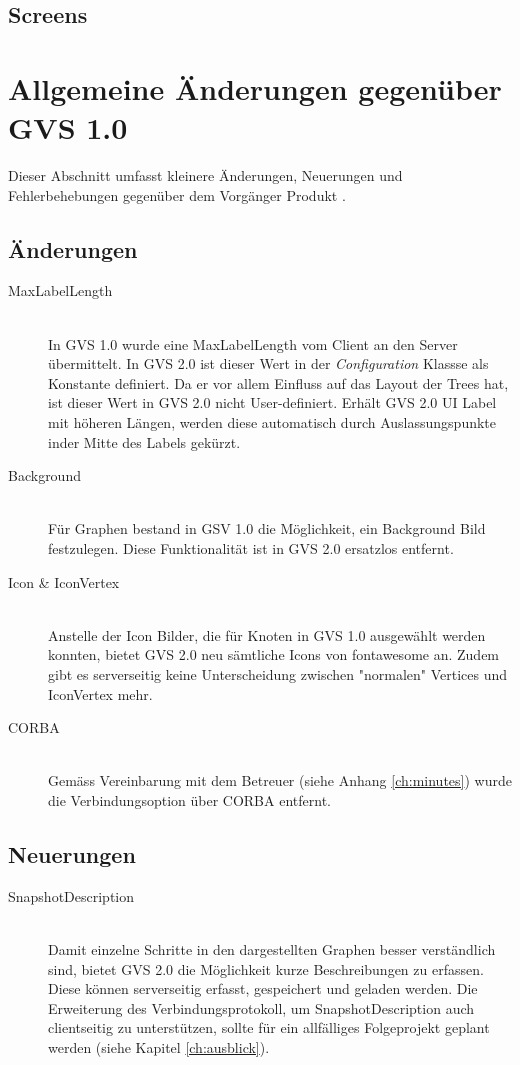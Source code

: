 \documentclass[11pt,a4paper,english,oneside]{book}
\numberwithin{equation}{chapter}
\begin{document}
	\subsection{Screens}
	
	\section{Allgemeine Änderungen gegenüber GVS 1.0}
	Dieser Abschnitt umfasst kleinere Änderungen, Neuerungen und Fehlerbehebungen gegenüber dem Vorgänger Produkt \cite{gvs1}. 
	
	\subsection{Änderungen}
	\begin{description}
		\item[MaxLabelLength] \hfill \\ In GVS 1.0 wurde eine MaxLabelLength vom Client an den Server übermittelt. In GVS 2.0 ist dieser Wert in der \textit{Configuration} Klassse als Konstante definiert. Da er vor allem Einfluss auf das Layout der Trees hat, ist dieser Wert in GVS 2.0 nicht User-definiert. Erhält GVS 2.0 UI Label mit höheren Längen, werden diese automatisch durch Auslassungspunkte inder Mitte des Labels gekürzt.
		\item[Background] \hfill \\ Für Graphen bestand in GSV 1.0 die Möglichkeit, ein Background Bild festzulegen. Diese Funktionalität ist in GVS 2.0 ersatzlos entfernt.
		\item[Icon \& IconVertex] \hfill \\ Anstelle der Icon Bilder, die für Knoten in GVS 1.0 ausgewählt werden konnten, bietet GVS 2.0 neu sämtliche Icons von \gls{fontawesome} \cite{fontawesome} an. Zudem gibt es serverseitig keine Unterscheidung zwischen "normalen" Vertices und IconVertex mehr.
		\item[CORBA] \hfill \\Gemäss Vereinbarung mit dem Betreuer (siehe Anhang \ref{ch:minutes}) wurde die Verbindungsoption über CORBA entfernt.
	\end{description}

	\subsection{Neuerungen}
	\begin{description}
		\item[SnapshotDescription] \hfill \\ Damit einzelne Schritte in den dargestellten Graphen besser verständlich sind, bietet GVS 2.0 die Möglichkeit kurze Beschreibungen zu erfassen. Diese können serverseitig erfasst, gespeichert und geladen werden. Die Erweiterung des Verbindungsprotokoll, um SnapshotDescription auch clientseitig zu unterstützen, sollte für ein allfälliges Folgeprojekt geplant werden (siehe Kapitel \ref{ch:ausblick}).
	\end{description}
	
\end{document}
